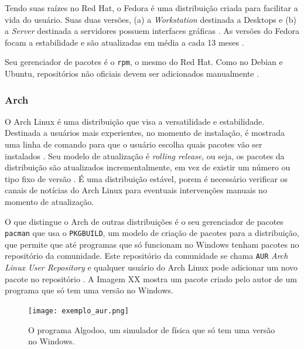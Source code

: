 \documentclass[
article,			%
12pt,				%
openright,			%
oneside,			%
a4paper,			%
chapter=TITLE,		%
section=TITLE,		%
subsection=TITLE,	%
subsubsection=TITLE,%
subsubsubsection=TITLE, %
english,			%
brazil,				%
]{abntex2}
\def\code#1{\texttt{#1}}
\begin{document}
Tendo suas raízes no Red Hat, o Fedora é uma distribuição criada para
facilitar a vida do usuário. Suas duas versões, (a) a
\emph{Workstation} destinada a Desktops e (b) a \emph{Server}
destinada a servidores possuem interfaces gráficas
\cite{FedoraProject2018}. As versões do Fedora focam a estabilidade e
são atualizadas em média a cada 13 meses \cite{FedoraProject2018a}.

Seu gerenciador de pacotes é o \code{rpm}, o mesmo do Red Hat. Como no
Debian e Ubuntu, repositórios não oficiais devem ser adicionados
manualmente \cite{FedoraProject2018b}.

\subsubsection{Arch}

O Arch Linux é uma distribuição que visa a versatilidade e
estabilidade. Destinada a usuários mais experientes, no momento de
instalação, é mostrada uma linha de comando para que o usuário escolha
quais pacotes vão ser instalados \cite{ArchWiki2018a}. Seu modelo de
atualização é \emph{rolling release}, ou seja, os pacotes da
distribuição são atualizados incrementalmente, em vez de existir um
número ou tipo fixo de versão \cite{ArchWiki2018c}. É uma distribuição
estável, porem é necessário verificar os canais de notícias do Arch
Linux para eventuais intervenções manuais no momento de atualização.

O que distingue o Arch de outras distribuições é o seu gerenciador de
pacotes \code{pacman} que usa o \code{PKGBUILD}, um modelo de criação
de pacotes para a distribuição, que permite que até programas que só
funcionam no Windows tenham pacotes no repositório da comunidade. Este
repositório da comunidade se chama \code{AUR} \emph{Arch Linux User
Repository} e qualquer usuário do Arch Linux pode adicionar um novo
pacote no repositório \cite{ArchWiki2018d}. A Imagem XX mostra um
pacote criado pelo autor de um programa que só tem uma versão no
Windows.

\begin{figure}[!htbp]
    \caption{\label{fig:exemplo-aur}O programa Algodoo, um simulador
    de física que só tem uma versão no Windows.}
    \begin{center}
        \texttt{[image: exemplo\_aur.png]}
    \end{center}
\end{figure}

\pagebreak 
\end{document}
